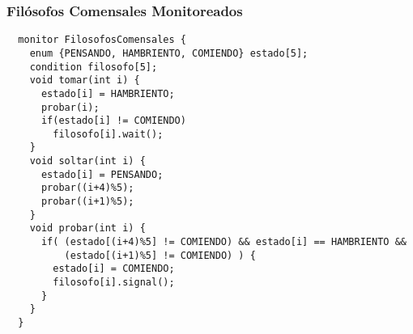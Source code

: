 \documentclass[letter]{beamer}
\begin{document}
\begin{frame}[fragile]
  \frametitle{Filósofos Comensales Monitoreados}

\begin{verbatim}
  monitor FilosofosComensales {
    enum {PENSANDO, HAMBRIENTO, COMIENDO} estado[5];
    condition filosofo[5];
    void tomar(int i) {
      estado[i] = HAMBRIENTO;
      probar(i);
      if(estado[i] != COMIENDO)
        filosofo[i].wait();
    }
    void soltar(int i) {
      estado[i] = PENSANDO;
      probar((i+4)%5);
      probar((i+1)%5);
    }
    void probar(int i) {
      if( (estado[(i+4)%5] != COMIENDO) && estado[i] == HAMBRIENTO && 
          (estado[(i+1)%5] != COMIENDO) ) {
        estado[i] = COMIENDO;
        filosofo[i].signal();
      }
    }
  }
\end{verbatim}

\end{frame}
\end{document}
